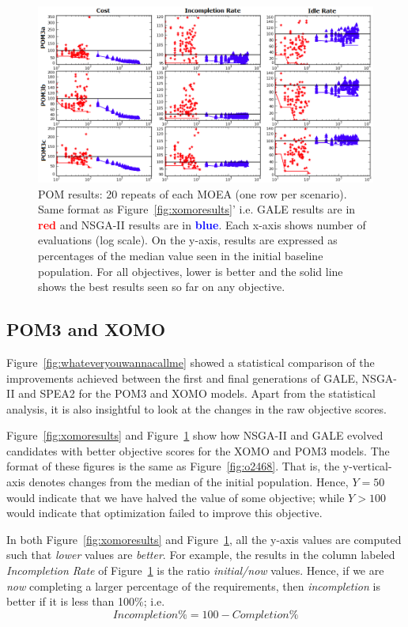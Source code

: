 \documentclass[10pt,journal,compsoc]{IEEEtran}
\newcommand{\fig}[1]{Figure~\ref{fig:#1}}
\begin{document}
\begin{figure}[!t]
 \includegraphics[width=7in]{figures/figure_analytics_obj_score_plots.png}
\caption{POM results: 20 repeats of each MOEA (one row
per scenario). Same format as \fig{xomoresults}' i.e.
GALE results are in 
\textcolor{red}{{\bf red}}
and NSGA-II results are in 
 \textcolor{blue}{{\bf blue}}. Each x-axis shows number of evaluations (log scale).
On the y-axis, results are expressed
as percentages of the median value seen in the  initial baseline population. 
For all objectives, lower is better and the solid line shows
the best results seen so far on any objective.    }
\label{fig:zdt1objspace}
\end{figure}


\subsection{POM3 and XOMO}

\fig{whateveryouwannacallme} showed a statistical comparison of the improvements
achieved between the first and final generations
of GALE, NSGA-II and SPEA2 for the POM3 and XOMO models.
Apart from the statistical analysis, it is also insightful
to look at the changes in the raw objective scores.

\fig{xomoresults} and 
\fig{zdt1objspace} show  how NSGA-II and GALE evolved candidates
with better objective scores for the XOMO and POM3 models.
The format of these figures is the same as \fig{o2468}.
That is,
the y-vertical-axis denotes
changes from the median of the initial population.
Hence, $Y=50$ would indicate that we have halved the value of some objective;
while  $Y \gt 100$ would indicate that optimization failed to improve this objective.

In both \fig{xomoresults} and \fig{zdt1objspace}, all 
the y-axis values are computed such that {\em lower}
values are {\em better}. For example, the results in the column
labeled {\em Incompletion Rate} of \fig{zdt1objspace}
is the ratio {\em initial/now} values. Hence, if we are {\em now} completing a larger
percentage of the requirements, then {\em incompletion} is better if it is
less than 100\%; i.e. \[\mathit{Incompletion}\% = 100 - \mathit{Completion}\%\]
\end{document}

